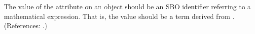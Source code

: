 The value of the attribute  on an \EventAssignment object
should be an SBO identifier referring to a mathematical expression.  That
is, the value should be a term derived from \sbomathformula.  (References:
.)
